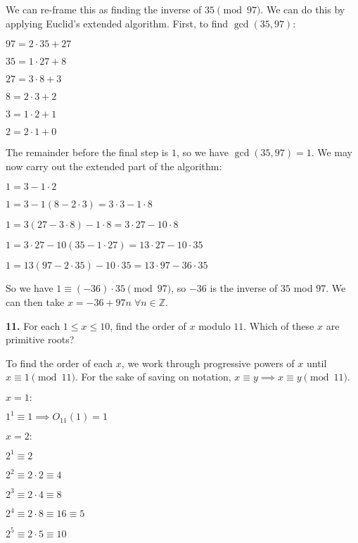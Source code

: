 \documentclass[12pt]{amsart}
\def\ZZ{{\mathbb Z}}
\begin{document}
We can re-frame this as finding the inverse of $35\pmod{97}$. We can do this by applying Euclid's extended algorithm. First, to find $\gcd(35, 97)$:

\medskip

$97 = 2 \cdot 35 + 27$

$35 = 1 \cdot 27 + 8 $

$27 = 3 \cdot 8 + 3$

$8 = 2 \cdot 3 + 2$

$3 = 1\cdot 2 + 1$

$2 = 2 \cdot 1 + 0$

\medskip

The remainder before the final step is $1$, so we have $\gcd(35, 97) = 1$. We may now carry out the extended part of the algorithm:

\medskip

$1 = 3 - 1\cdot 2$

$1 = 3-1(8-2\cdot 3) = 3\cdot 3 - 1\cdot 8 $

$1 = 3(27-3\cdot 8) - 1\cdot 8 = 3\cdot 27 - 10\cdot 8$

$1 = 3\cdot 27 - 10(35 - 1\cdot 27) = 13\cdot 27 - 10 \cdot 35$

$1 = 13(97 - 2\cdot 35) - 10\cdot 35 = 13\cdot 97 - 36\cdot 35$

\medskip

So we have $1 \equiv (-36) \cdot 35 \pmod{97}$, so $-36$ is the inverse of $35$ mod $97$. We can then take $x = -36 + 97n \;\forall n\in\ZZ$.

\medskip

{\bf 11.} For each $1\leq x\leq 10$, find the order of $x$ modulo $11$.  Which of these $x$ are primitive roots?

To find the order of each $x$, we work through progressive powers of $x$ until $x \equiv 1\pmod{11}$. For the sake of saving on notation, $x \equiv y \implies x \equiv y\pmod{11}$.

\medskip
$x = 1:$

$1^1 \equiv 1 \implies O_{11}(1) = 1$

\bigskip

$x = 2:$

\smallskip

$2^1 \equiv 2$

$2^2 \equiv 2\cdot 2 \equiv 4$

$2^3 \equiv 2\cdot 4 \equiv 8$

$2^4 \equiv 2\cdot 8 \equiv 16 \equiv 5$

$2^5 \equiv 2\cdot 5 \equiv 10$
\end{document}
